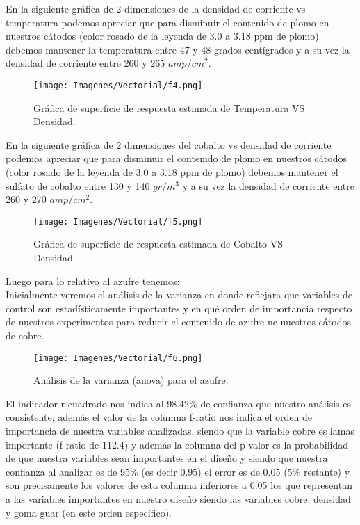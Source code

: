 En la siguiente gr\'afica de 2 dimensiones de la densidad de corriente vs temperatura podemos apreciar que para disminuir el contenido de plomo en nuestros c\'atodos (color rosado de la leyenda de 3.0 a 3.18 ppm de plomo) debemos mantener la temperatura entre 47 y 48 grados cent\'igrados y a su vez la densidad de corriente entre 260 y 265 $amp/cm^2$.

\begin{figure}[H]
 \centering
 \texttt{[image: Imagenes/Vectorial/f4.png]}
 \caption{Gr\'afica de superficie de respuesta estimada de Temperatura VS Densidad.}
 \label{fig:f4}
\end{figure}

En la siguiente gr\'afica de 2 dimensiones del cobalto vs densidad de corriente podemos apreciar que para disminuir el contenido de plomo en nuestros c\'atodos (color rosado de la leyenda de 3.0 a 3.18 ppm de plomo) debemos mantener el sulfato de cobalto entre 130 y 140 $gr/m^3$ y a su vez la densidad de corriente entre 260 y 270 $amp/cm^2$.

\begin{figure}[H]
 \centering
 \texttt{[image: Imagenes/Vectorial/f5.png]}
 \caption{Gr\'afica de superficie de respuesta estimada de Cobalto VS Densidad.}
 \label{fig:f5}
\end{figure}

Luego para lo relativo al azufre tenemos:\\

Inicialmente veremos el an\'alisis de la varianza en donde reflejara que variables de control son estad\'isticamente importantes y en qu\'e orden de importancia respecto de nuestros experimentos para reducir el contenido de azufre ne  nuestros c\'atodos de cobre.

\begin{figure}[H]
 \centering
 \texttt{[image: Imagenes/Vectorial/f6.png]}
 \caption{An\'alisis de la varianza (anova) para el azufre.}
 \label{fig:f6}
\end{figure}

El indicador r-cuadrado nos indica al 98.42\% de confianza que nuestro an\'alisis es consistente; adem\'as el valor de la columna f-ratio nos indica el orden de importancia de nuestra variables analizadas, siendo que la variable cobre es lamas importante (f-ratio de 112.4) y adem\'as la columna del p-valor es la probabilidad de que nuestra variables sean importantes en el dise\~no y siendo que nuestra confianza al analizar es de 95\% (es decir 0.95) el error es de 0.05 (5\% restante) y son precisamente los valores de esta columna inferiores a 0.05 los que representan a las variables importantes en nuestro dise\~no siendo las variables cobre, densidad y goma guar (en este orden espec\'ifico).\\


